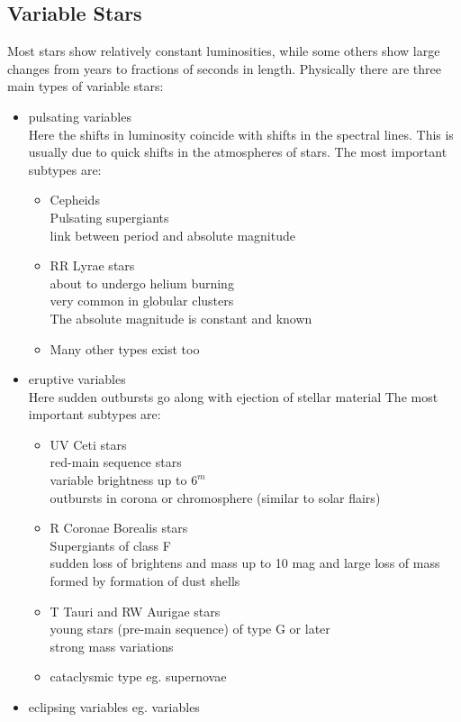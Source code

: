 \documentclass[11pt,a4paper]{article}
\begin{document}
\subsection{Variable Stars}
Most stars show relatively constant luminosities, while some others show large changes from years to fractions of seconds in length.
Physically there are three main types of variable stars:
\begin{itemize}
    \item pulsating variables \\
        Here the shifts in luminosity coincide with shifts in the spectral lines.
        This is usually due to quick shifts in the atmospheres of stars. 
        The most important subtypes are: 
        \begin{itemize}
            \item Cepheids \\ 
                Pulsating supergiants \\ 
                link between period and absolute magnitude 
            \item RR Lyrae stars \\ 
                about to undergo helium burning\\ 
                very common in globular clusters \\ 
                The absolute magnitude is constant and known 
            \item Many other types exist too
        \end{itemize}
    \item eruptive variables \\  
        Here sudden outbursts go along with ejection of stellar material  
        The most important subtypes are: 
        \begin{itemize}
            \item UV Ceti stars \\ 
                red-main sequence stars \\ 
                variable brightness up to $6^m$ \\ 
                outbursts in corona or chromosphere (similar to solar flairs)
            \item R Coronae Borealis stars \\ 
                Supergiants of class F \\ 
                sudden loss of brightens and mass up to 10 mag and large loss of mass \\ 
                formed by formation of dust shells
            \item T Tauri and RW Aurigae stars\\ 
                young stars (pre-main sequence) of type G or later\\ 
                strong mass variations 
            \item cataclysmic type eg. supernovae 
        \end{itemize}
    \item eclipsing variables eg. variables  
\end{itemize}
\end{document}
